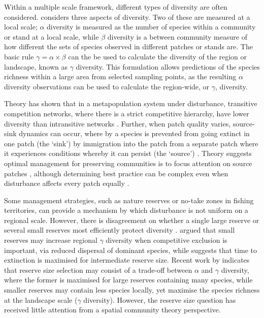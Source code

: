 Within a multiple scale framework, different types of diversity are often considered. \cite{whittaker1960vegetation} considers three aspects of diversity. Two of these are measured at a local scale; $\alpha$ diversity is measured as the number of species within a community or stand at a local scale, while $\beta$ diversity is a  between community measure of how different the sets of species observed in different patches or stands are. The basic rule $\gamma=\alpha \times \beta$ can the be used to calculate the diversity of the region or landscape, known as $\gamma$ diversity. This formulation allows predictions of the species richness within a large area from selected sampling points, as the resulting $\alpha$ diversity observations can be used to calculate the region-wide, or $\gamma$, diversity.

Theory has shown that in a metapopulation system under disturbance, transitive competition networks, where there is a strict competitive hierarchy, have lower diversity than intransitive networks \citep{caswell1991disturbance}. Further, when patch quality varies, source-sink dynamics can occur, where by a species is prevented from going extinct in one patch (the `sink') by immigration into the patch from a separate patch where it experiences conditions whereby it can persist (the `source')  \citep{pulliam1988sources}. Theory suggests optimal management for preserving communities is to focus attention on source patches \citep[e.g.][]{runge2006role}, although determining best practice can be complex even when disturbance affects every patch equally \citep{strasser2012contributions}.

Some management strategies, such as nature reserves or no-take zones in fishing territories, can provide a mechanism by which disturbance is not uniform on a regional scale. However, there is disagreement on whether a single large reserve or several small reserves most efficiently protect diversity \citep{simberloff1982refuge}. \cite{simberloff1991nestedness} argued that small reserves may increase regional $\gamma$ diversity when competitive exclusion is important, via reduced dispersal of dominant species, while \cite{ovaskainen2002long} suggests that time to extinction is maximised for intermediate reserve size. Recent work by \cite{lasky2013reserve} indicates that reserve size selection may consist of a trade-off between $\alpha$ and $\gamma$ diversity, where the former is maximised for large reserves containing many species, while smaller reserves may contain less species locally, yet maximise the species richness at the landscape scale ($\gamma$ diversity). However, the reserve size question has received little attention from a spatial community theory perspective.

